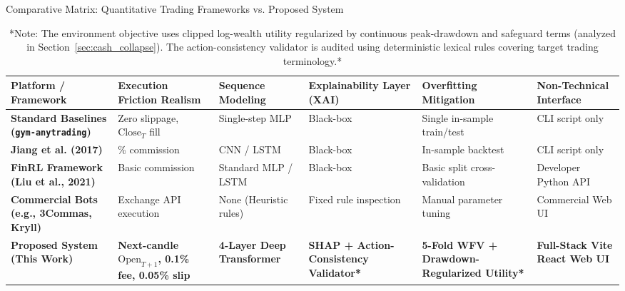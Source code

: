 \documentclass[11pt,a4paper]{article}
\begin{document}
\begin{table}[H]
\centering
\footnotesize
\caption{Comparative Matrix: Quantitative Trading Frameworks vs. Proposed System}
\label{tab:framework_comparison}
\begin{tabularx}{\textwidth}{>{\raggedright\arraybackslash}p{2.7cm} >{\raggedright\arraybackslash}X >{\raggedright\arraybackslash}X >{\raggedright\arraybackslash}p{2.4cm} >{\raggedright\arraybackslash}X >{\raggedright\arraybackslash}X}
\toprule
\textbf{Platform / Framework} & \textbf{Execution Friction Realism} & \textbf{Sequence Modeling} & \textbf{Explainability Layer (XAI)} & \textbf{Overfitting Mitigation} & \textbf{Non-Technical Interface} \\
\midrule
\textbf{Standard Baselines (\texttt{gym-anytrading})} & Zero slippage, $\text{Close}_T$ fill & Single-step MLP & Black-box & Single in-sample train/test & CLI script only \\
\addlinespace
\textbf{Jiang et al. (2017) \cite{jiang2017}} & 0.25\% commission & CNN / LSTM & Black-box & In-sample backtest & CLI script only \\
\addlinespace
\textbf{FinRL Framework (Liu et al., 2021) \cite{liu2021}} & Basic commission & Standard MLP / LSTM & Black-box & Basic split cross-validation & Developer Python API \\
\addlinespace
\textbf{Commercial Bots (e.g., 3Commas, Kryll)} & Exchange API execution & None (Heuristic rules) & Fixed rule inspection & Manual parameter tuning & Commercial Web UI \\
\addlinespace
\textbf{Proposed System (This Work)} & \textbf{Next-candle $\text{Open}_{T+1}$, 0.1\% fee, 0.05\% slip} & \textbf{4-Layer Deep Transformer} & \textbf{SHAP + Action-Consistency Validator*} & \textbf{5-Fold WFV + Drawdown-Regularized Utility*} & \textbf{Full-Stack Vite React Web UI} \\
\bottomrule
\end{tabularx}
\caption*{*Note: The environment objective uses clipped log-wealth utility regularized by continuous peak-drawdown and safeguard terms (analyzed in Section~\ref{sec:cash_collapse}). The action-consistency validator is audited using deterministic lexical rules covering target trading terminology.*}
\end{table}
\end{document}
